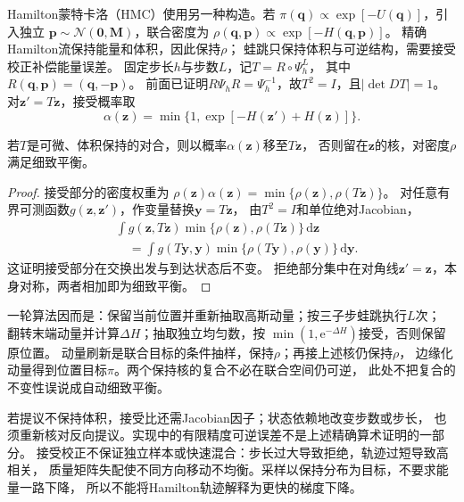 Hamilton蒙特卡洛（HMC）使用另一种构造。若
$\pi(\bm q)\propto\exp[-U(\bm q)]$，引入独立
$\bm p\sim\mathcal N(\bm0,\bm M)$，联合密度为
$\rho(\bm q,\bm p)\propto\exp[-H(\bm q,\bm p)]$。
精确Hamilton流保持能量和体积，因此保持$\rho$；
蛙跳只保持体积与可逆结构，需要接受校正补偿能量误差。
固定步长$h$与步数$L$，记$T=R\circ\Psi_h^L$，
其中$R(\bm q,\bm p)=(\bm q,-\bm p)$。
前面已证明$R\Psi_hR=\Psi_h^{-1}$，故$T^2=I$，且$|\det DT|=1$。
对$\bm z' =T\bm z$，接受概率取
\begin{equation}
 \alpha(\bm z)=\min\{1,\exp[-H(\bm z')+H(\bm z)]\}.
 \label{eq:dynamical-hmc-acceptance}
\end{equation}

\begin{theorem}[HMC提议的细致平衡]
 \label{thm:action-state-hmc-balance}
 若$T$是可微、体积保持的对合，则以概率$\alpha(\bm z)$移至$T\bm z$，
 否则留在$\bm z$的核，对密度$\rho$满足细致平衡。
\end{theorem}
\begin{proof}
 接受部分的密度权重为
 $\rho(\bm z)\alpha(\bm z)=\min\{\rho(\bm z),\rho(T\bm z)\}$。
 对任意有界可测函数$g(\bm z,\bm z')$，作变量替换$\bm y=T\bm z$，
 由$T^2=I$和单位绝对Jacobian，
 \[
 \begin{split}
 &\int g(\bm z,T\bm z)\min\{\rho(\bm z),\rho(T\bm z)\}\,\mathrm d\bm z\\
 &\quad=\int g(T\bm y,\bm y)
                   \min\{\rho(T\bm y),\rho(\bm y)\}\,\mathrm d\bm y .
 \end{split}
 \]
 这证明接受部分在交换出发与到达状态后不变。
 拒绝部分集中在对角线$\bm z'=\bm z$，本身对称，两者相加即为细致平衡。
\end{proof}

一轮算法因而是：保留当前位置并重新抽取高斯动量；按三子步蛙跳执行$L$次；
翻转末端动量并计算$\Delta H$；抽取独立均匀数，按
$\min(1,\mathrm e^{-\Delta H})$接受，否则保留原位置。
动量刷新是联合目标的条件抽样，保持$\rho$；再接上述核仍保持$\rho$，
边缘化动量得到位置目标$\pi$。两个保持核的复合不必在联合空间仍可逆，
此处不把复合的不变性误说成自动细致平衡。

若提议不保持体积，接受比还需Jacobian因子；状态依赖地改变步数或步长，
也须重新核对反向提议。实现中的有限精度可逆误差不是上述精确算术证明的一部分。
接受校正不保证独立样本或快速混合：步长过大导致拒绝，轨迹过短导致高相关，
质量矩阵失配使不同方向移动不均衡。采样以保持分布为目标，不要求能量一路下降，
所以不能将Hamilton轨迹解释为更快的梯度下降。

